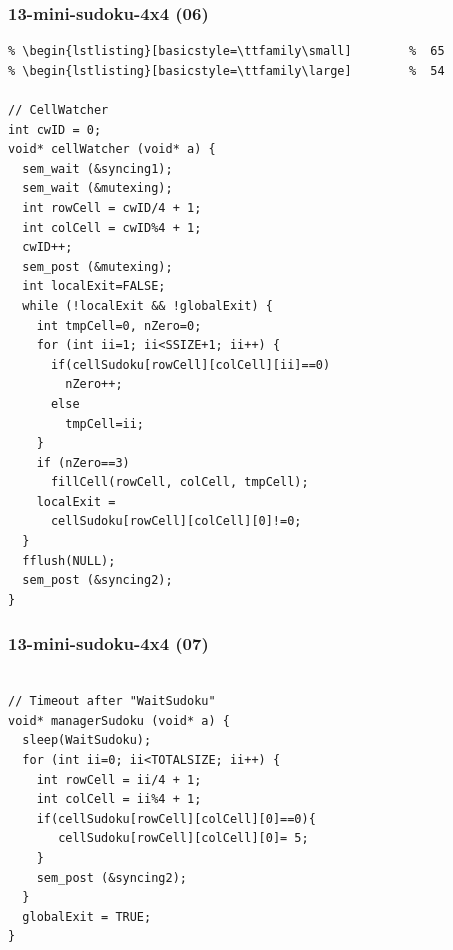 \documentclass[xcolor=table, notheorems, hyperref={pdfpagelabels=false}]{beamer}
\begin{document}
\begin{frame}[fragile]
\frametitle{13-mini-sudoku-4x4 (06)}
\begin{lstlisting}[basicstyle=\ttfamily\tiny]         % 108
% \begin{lstlisting}[basicstyle=\ttfamily\footnotesize] %  72
% \begin{lstlisting}[basicstyle=\ttfamily\small]        %  65
% \begin{lstlisting}[basicstyle=\ttfamily\large]        %  54

// CellWatcher
int cwID = 0;
void* cellWatcher (void* a) {
  sem_wait (&syncing1);
  sem_wait (&mutexing);
  int rowCell = cwID/4 + 1;
  int colCell = cwID%4 + 1;
  cwID++;
  sem_post (&mutexing);
  int localExit=FALSE;
  while (!localExit && !globalExit) {
    int tmpCell=0, nZero=0;
    for (int ii=1; ii<SSIZE+1; ii++) {
      if(cellSudoku[rowCell][colCell][ii]==0) 
        nZero++;
      else 
        tmpCell=ii;
    }
    if (nZero==3) 
      fillCell(rowCell, colCell, tmpCell);
    localExit = 
      cellSudoku[rowCell][colCell][0]!=0;
  }
  fflush(NULL);
  sem_post (&syncing2);
}

\end{lstlisting}
\end{frame}

\begin{frame}[fragile]
\frametitle{13-mini-sudoku-4x4 (07)}
\begin{lstlisting}[basicstyle=\ttfamily\large]        %  54

// Timeout after "WaitSudoku"
void* managerSudoku (void* a) {
  sleep(WaitSudoku);
  for (int ii=0; ii<TOTALSIZE; ii++) {
    int rowCell = ii/4 + 1;
    int colCell = ii%4 + 1;
    if(cellSudoku[rowCell][colCell][0]==0){
       cellSudoku[rowCell][colCell][0]= 5;
    }
    sem_post (&syncing2);
  }
  globalExit = TRUE;
}

\end{lstlisting}
\end{frame}
\end{document}
